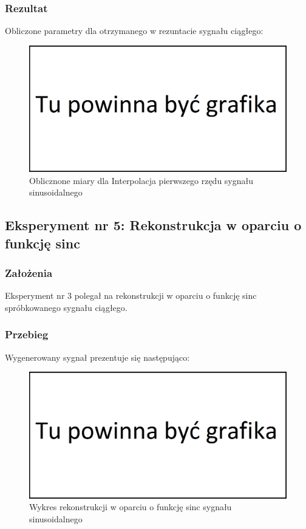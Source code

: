 \documentclass[12pt]{article}
\begin{document}
\subsubsection{Rezultat}
Obliczone parametry dla otrzymanego w rezuntacie sygnału ciągłego:
\begin{figure}[H]
	\centering
	\includegraphics[width=\linewidth]{tmp.jpg}
	\caption{Oblicznone miary dla Interpolacja pierwszego rzędu sygnału sinusoidalnego}
	\label{wartości dla eksperymentu 4}
\end{figure}


\newpage
\subsection{Eksperyment nr 5: Rekonstrukcja w oparciu o funkcję sinc }
\subsubsection{Założenia}
Eksperyment nr 3 polegał na rekonstrukcji w oparciu o funkcję sinc spróbkowanego sygnału ciągłego.
\subsubsection{Przebieg}
Wygenerowany sygnał prezentuje się następująco:
\begin{figure}[H]
	\centering
	\includegraphics[width=\linewidth]{tmp.jpg}
	\caption{Wykres rekonstrukcji w oparciu o funkcję sinc sygnału sinusoidalnego}
	\label{wykres dla eksperymentu 5}
\end{figure}
\end{document}
